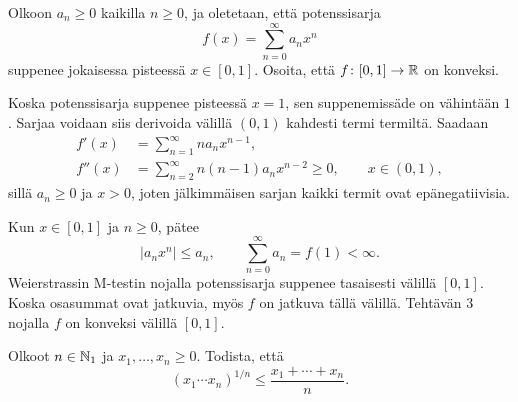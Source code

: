\documentclass[11pt,a4paper]{amsart}
\begin{document}
\begin{exercise}
  Olkoon \(a_n\geq 0\) kaikilla \(n\geq 0\), ja oletetaan, että
  potenssisarja
  \[
    f(x)=\sum_{n=0}^{\infty}a_n x^n
  \]
  suppenee jokaisessa pisteessä \(x\in[0,1]\).
  Osoita, että \(f\colon[0,1]\to\mathbb{R}\) on konveksi.
\end{exercise}

\begin{solution}
  Koska potenssisarja suppenee pisteessä \(x=1\), sen suppenemissäde
  on vähintään \(1\). Sarjaa voidaan siis derivoida välillä \((0,1)\)
  kahdesti termi termiltä. Saadaan
  \[
    \begin{aligned}
      f'(x)&=\sum_{n=1}^{\infty}na_nx^{n-1},\\
      f''(x)&=\sum_{n=2}^{\infty}n(n-1)a_nx^{n-2}\geq 0,
      \qquad x\in(0,1),
    \end{aligned}
  \]
  sillä \(a_n\geq 0\) ja \(x>0\), joten jälkimmäisen sarjan kaikki
  termit ovat epänegatiivisia.

  Kun \(x\in[0,1]\) ja \(n\geq0\), pätee
  \[
    |a_nx^n|\leq a_n,
    \qquad \sum_{n=0}^{\infty}a_n=f(1)<\infty.
  \]
  Weierstrassin M-testin nojalla potenssisarja suppenee tasaisesti
  välillä \([0,1]\). Koska osasummat ovat jatkuvia, myös \(f\) on
  jatkuva tällä välillä. Tehtävän 3 nojalla \(f\) on konveksi
  välillä \([0,1]\).
\end{solution}

\begin{exercise}
  Olkoot \(n\in\mathbb{N}_1\) ja \(x_1,\ldots,x_n\geq 0\).
  Todista, että
  \[
    (x_1\cdots x_n)^{1/n}\leq\frac{x_1+\cdots+x_n}{n}.
  \]
\end{exercise}
\end{document}
